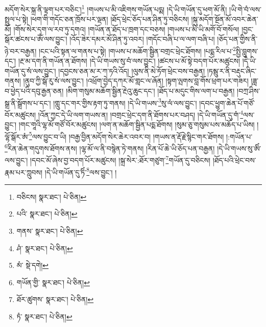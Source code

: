 མདོག་སེར་སྐྲ་ནི་ལྟག་པར་བཅིང་།\footnote{བཅིངས།  སྣར་ཐང་།  པེ་ཅིན། } །གཡས་པ་མི་འཇིགས་གཡོན་པདྨ། །དེ་ཡི་གཡོན་དུ་ཕག་མོ་ནི། །ཡི་གེ་བཾ་ལས་སྤྲུལ་པ་སྟེ། །ཕག་གི་གདོང་ཅན་ཁྲོས་པར་ལྡན། །ཐོད་ཕྲེང་ཅོད་པན་ཤིན་ཏུ་བཅིངས། །སྐུ་མདོག་སྔོན་མོ་འབར་ཆེན་མོ། །གོས་སེར་དག་ལ་རབ་ཏུ་དགའ། །གཡོན་ན་ཐོད་པ་ཁྲག་དང་བཅས། །གཡས་པ་མི་ཡི་མགོ་བོ་གསོལ། །བྱང་སྒོར་ཚངས་པ་ཨོཾ་ལས་བྱུང་། །འོད་ཟེར་དམར་མོ་ཤིན་ཏུ་འབར། །གདོང་བཞི་པ་ལ་ལག་བཞི་པ། །ཅོད་པན་གྱིས་ནི་ཉེ་བར་བརྒྱན། །ངང་པའི་སྟན་ལ་གནས་པ་སྟེ། །གཡས་པ་མཆོག་སྦྱིན་བགྲང་ཕྲེང་ཐོགས། །པདྨ་རིལ་པ་\footnote{པའི་  སྣར་ཐང་།  པེ་ཅིན། }སྤྱི་བླུགས་དང་། །རྔ་མ་དག་ནི་གཡོན་ན་ཐོགས། །དེ་ཡི་གཡས་སུ་བཾ་ལས་བྱུང་། །ཚངས་པ་མོ་སྟེ་བདག་པོར་མཚུངས། །དེ་ཡི་གཡོན་དུ་སཾ་ལས་བྱུང་། །དབྱངས་ཅན་མ་ར་ཀ་ཏའི་འོད། །ལུས་ནི་མེ་ཏོག་ཕྲེང་བས་བརྒྱན། །ཏམྦུ་ར་ནི་བརྡུང་ཞིང་གནས། །ནུབ་ཀྱི་སྒོ་རུ་སཾ་ལས་བྱུང་། །འཕྲོག་བྱེད་དཀར་མོ་གླང་ལ་ཞོན། །སྟག་ལྤགས་བླ་གོས་ཕྲག་པར་གཟར། །ཟླ་བ་ཕྱེད་པའི་དབུ་རྒྱན་ཅན། །མིག་གསུམ་མཆོག་སྦྱིན་རྔེའུ་ཆུང་དང་། །ཐོད་པ་མདུང་གིས་ལག་པ་བརྒྱན། །བཀྲ་ཤིས་སྒྲ་ནི་སྒྲོགས་པ་དང་། །གླུ་དང་གར་གྱིས་རྟག་ཏུ་གནས། །དེ་ཡི་གཡས་\footnote{གནས་  སྣར་ཐང་།  པེ་ཅིན། }སུ་ལཾ་ལས་བྱུང་། །དབང་ཕྱུག་ཆེན་པོ་གཙོ་བོར་མཚུངས། །འོན་ཀྱང་དེ་ཡི་ལག་གཡས་ན། །བགྲང་ཕྲེང་དག་ནི་ཐོགས་པར་བཤད། །དེ་ཡི་གཡོན་དུ་གཾ་\footnote{ཤཾ་  སྣར་ཐང་།  པེ་ཅིན། }ལས་བྱུང་། །གང་གཱའི་ལྷ་མོ་གཙོ་བོར་མཚུངས། །ལག་ན་མཆོག་སྦྱིན་པདྨ་ཐོགས། །སུམ་ཅུ་གསུམ་པས་མཆོད་པ་ཡིས། །ལྷོ་སྒོར་ཨཾ་\footnote{མཾ་  སྡེ་དགེ། }ལས་བྱུང་བ་ཡི། །བརྒྱ་བྱིན་མདོག་སེར་ཆེར་འབར་བ། །གཡས་ན་རྡོ་རྗེ་སྙིང་གར་ཐོགས། །:གཡོན་པ་\footnote{གཡོན་གྱི་  སྣར་ཐང་།  པེ་ཅིན། }རིན་ཆེན་གདུགས་ཐོགས་ནས། །ལྷ་མོ་ལ་ནི་བསྙེན་ཏེ་གནས། །རིན་པོ་ཆེ་ཡི་ཅོད་པན་བརྒྱན། །དེ་ཡི་གཡས་སུ་ཨིཾ་ལས་བྱུང་། །དབང་མོ་ཞེས་བྱ་བདག་པོར་མཚུངས། །སྐྲ་སེར་:ཐོར་གཙུག་\footnote{ཐོར་ཚུགས་  སྣར་ཐང་།  པེ་ཅིན། }གཡོན་དུ་བཅིངས། །ཐོད་པའི་ཕྲེང་བས་རྣམ་པར་ཀླུབས། །དེ་ཡི་གཡོན་དུ་ཏིཾ་\footnote{ཏཾ་  སྣར་ཐང་།  པེ་ཅིན། }ལས་བྱུང་། །
